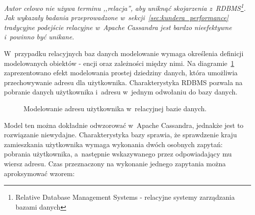 \emph{Autor celowo nie używa terminu ,,relacja'', aby uniknąć skojarzenia z~RDBMS\footnote{Relative Database Management Systems - relacyjne systemy zarządzania bazami danych}. Jak wykazały badania przeprowadzone w~sekcji~\ref{sec:kundera_performance} tradycyjne podejście relacyjne w~Apache Cassandra jest bardzo nieefektywne i~powinno być unikane.}

W~przypadku relacyjnych baz danych modelowanie wymaga określenia definicji modelowanych obiektów - encji oraz zależności między nimi. Na diagramie~\ref{fig:er_user_address} zaprezentowano efekt modelowania prostej dziedziny danych, która umożliwia przechowywanie adresu dla użytkownika. Charakterystyka RDBMS pozwala na pobranie danych użytkownika i~adresu w~jednym odwołaniu do bazy danych.

\begin{figure}[ht!]
	\centering

	\caption{Modelowanie adresu użytkownika w~relacyjnej bazie danych.}
	\label{fig:er_user_address}
\end{figure}

Model ten można dokładnie odwzorować w~Apache Cassandra, jednakże jest to rozwiązanie niewydajne. Charakterystyka bazy sprawia, że sprawdzenie kraju zamieszkania użytkownika wymaga wykonania dwóch osobnych zapytań: pobrania użytkownika, a~następnie wskazywanego przez odpowiadający mu wiersz adresu. Czas przeznaczony na wykonanie jednego zapytania można aproksymować wzorem:

